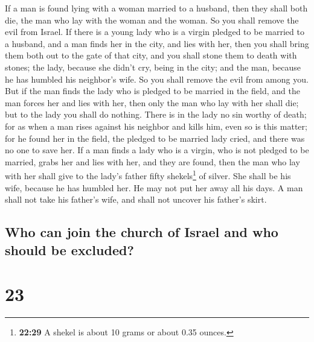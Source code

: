  If a man is found lying with a woman married to a
husband, then they shall both die, the man who lay with the woman and
the woman. So you shall remove the evil from Israel.  If
there is a young lady who is a virgin pledged to be married to a
husband, and a man finds her in the city, and lies with her,
 then you shall bring them both out to the gate of that
city, and you shall stone them to death with stones; the lady, because
she didn't cry, being in the city; and the man, because he has humbled
his neighbor's wife. So you shall remove the evil from among you.
 But if the man finds the lady who is pledged to be
married in the field, and the man forces her and lies with her, then
only the man who lay with her shall die;  but to the lady
you shall do nothing. There is in the lady no sin worthy of death; for
as when a man rises against his neighbor and kills him, even so is this
matter;  for he found her in the field, the pledged to be
married lady cried, and there was no one to save her.  If
a man finds a lady who is a virgin, who is not pledged to be married,
grabs her and lies with her, and they are found,  then
the man who lay with her shall give to the lady's father fifty
shekels\footnote{\textbf{22:29} A shekel is about 10 grams or about 0.35
  ounces.} of silver. She shall be his wife, because he has humbled her.
He may not put her away all his days.  A man shall not
take his father's wife, and shall not uncover his father's skirt.

\hypertarget{who-can-join-the-church-of-israel-and-who-should-be-excluded}{%
\subsection{Who can join the church of Israel and who should be
excluded?}\label{who-can-join-the-church-of-israel-and-who-should-be-excluded}}

\hypertarget{section-22}{%
\section{23}\label{section-22}}

